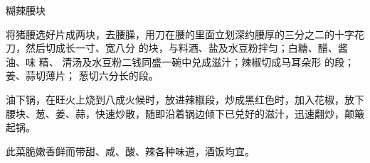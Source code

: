 \begin{recipe}[宫保腰块]{糊辣腰块}

\ingredients


\preparation

\step 将猪腰选好片成两块，去腰臊，用刀在腰的里面立划深约腰厚的三分之二的十字花
刀，然后切成长一寸、宽八分 的块，与料酒、盐及水豆粉拌匀；白糖、醋、酱油、味
精、 清汤及水豆粉二钱同盛一碗中兑成滋汁；辣椒切成马耳朵形 的段；姜、蒜切薄片；
葱切六分长的段。

\step 油下锅，在旺火上烧到八成火候时，放进辣椒段，炒成黑红色时，加入花椒，放下
腰块、葱、姜、蒜，快速炒散，随即沿着锅边倾下已兑好的滋汁，迅速翻炒，颠簸起锅。

\features

此菜脆嫩香鲜而带甜、咸、酸、辣各种味道，酒饭均宜。

\end{recipe}

